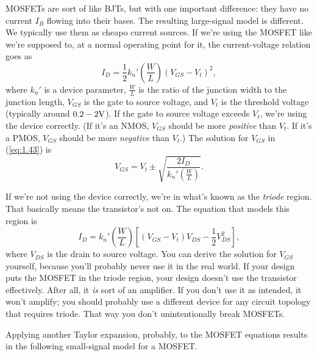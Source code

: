 MOSFETs are sort of like BJTs, but with one important difference: they have no current $I_{B}$ flowing into their bases. The resulting large-signal model is different. We typically use them as cheapo current sources. If we're using the MOSFET like we're supposed to, at a normal operating point for it, the current-voltage relation goes as
\begin{equation}
\label{eq:1.43}
I_{D} = \frac{1}{2} k_{n}' \left( \frac{W}{L} \right) \left( V_{GS} - V_{t} \right)^{2},
\end{equation}
where $k_{n}'$ is a device parameter, $\frac{W}{L}$ is the ratio of the junction width to the junction length, $V_{GS}$ is the gate to source voltage, and $V_{t}$ is the threshold voltage (typically around $0.2 \-- 2 \si{\V}$). If the gate to source voltage exceeds $V_{t}$, we're using the device correctly. (If it's an NMOS, $V_{GS}$ should be more \textit{positive} than $V_{t}$. If it's a PMOS, $V_{GS}$ should be more \textit{negative} than $V_{t}$.) The solution for $V_{GS}$ in (\ref{eq:1.43}) is
\begin{equation}
\label{eq:1.44}
V_{GS} = V_{t} \pm \sqrt{ \frac{2 I_{D}}{k_{n}' \left( \frac{W}{L} \right)}}.
\end{equation}

If we're not using the device correctly, we're in what's known as the \textit{triode} region. That basically means the transistor's not on. The equation that models this region is
\begin{equation}
\label{eq:1.45}
I_{D} = k_{n}' \left( \frac{W}{L} \right) \left[ \left( V_{GS} - V_{t} \right) V_{DS} - \frac{1}{2} V_{DS}^{2} \right],
\end{equation}
where $V_{DS}$ is the drain to source voltage. You can derive the solution for $V_{GS}$ yourself, because you'll probably never use it in the real world. If your design puts the MOSFET in the triode region, your design doesn't use the transistor effectively. After all, it \textit{is} sort of an amplifier. If you don't use it as intended, it won't amplify; you should probably use a different device for any circuit topology that requires triode. That way you don't unintentionally break MOSFETs.

Applying another Taylor expansion, probably, to the MOSFET equations results in the following small-signal model for a MOSFET.

